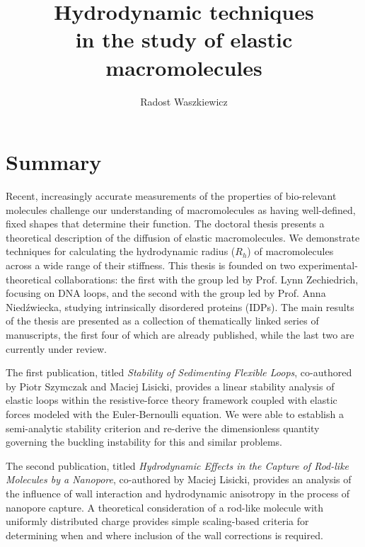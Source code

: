 \documentclass{doctoral}
\title{Hydrodynamic techniques\\in the study of elastic macromolecules}
\author{Radost Waszkiewicz}
\affiliation{University of Warsaw\\Faculty of Physics}
\begin{document}
 \maketitle

\section*{Summary}

Recent, increasingly accurate measurements of the properties of bio-relevant molecules challenge our understanding of macromolecules as having well-defined, fixed shapes that determine their function.
The doctoral thesis presents a theoretical description of the diffusion of elastic macromolecules.
We demonstrate techniques for calculating the hydrodynamic radius ($R_h$) of macromolecules across a wide range of their stiffness.
This thesis is founded on two experimental-theoretical collaborations: the first with the group led by Prof.
Lynn Zechiedrich, focusing on DNA loops, and the second with the group led by Prof.
Anna Niedźwiecka, studying intrinsically disordered proteins (IDPs).
The main results of the thesis are presented as a collection of thematically linked series of manuscripts, the first four of which are already published, while the last two are currently under review.

The first publication, titled \emph{Stability of Sedimenting Flexible Loops}, co-authored by Piotr Szymczak and Maciej Lisicki, provides a linear stability analysis of elastic loops within the resistive-force theory framework coupled with elastic forces modeled with the Euler-Bernoulli equation.
We were able to establish a semi-analytic stability criterion and re-derive the dimensionless quantity governing the buckling instability for this and similar problems.

The second publication, titled \emph{Hydrodynamic Effects in the Capture of Rod-like Molecules by a Nanopore}, co-authored by Maciej Lisicki, provides an analysis of the influence of wall interaction and hydrodynamic anisotropy in the process of nanopore capture.
A theoretical consideration of a rod-like molecule with uniformly distributed charge provides simple scaling-based criteria for determining when and where inclusion of the wall corrections is required.
\end{document}

